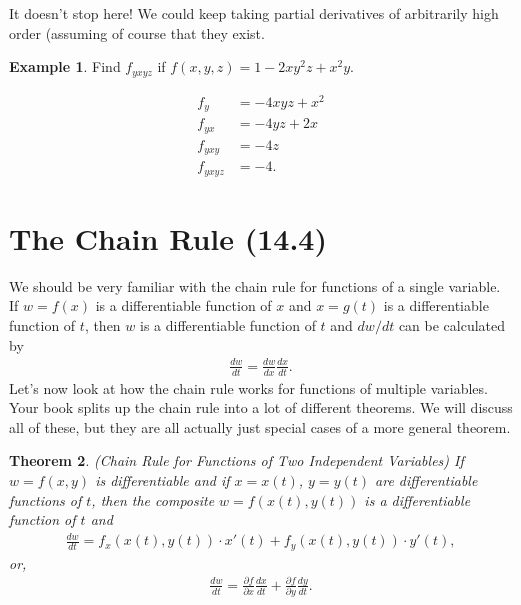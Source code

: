 \documentclass[12pt, letter]{article}
\theoremstyle{plain}
\newtheorem{theorem}{Theorem}
\numberwithin{theorem}{section}
\theoremstyle{definition}
\newtheorem{example}[theorem]{Example}
\begin{document}
\bigskip

\hrulefill

\bigskip

It doesn't stop here! We could keep taking partial derivatives of arbitrarily high order (assuming of course that they exist.

\bigskip

\hrulefill

\bigskip

\begin{example}
Find $f_{yxyz}$ if $f(x,y,z) = 1-2xy^2z+x^2y$.

\smallskip

\begin{align*}
f_y &= -4xyz+x^2\\
f_{yx} &= -4yz+2x\\
f_{yxy} &= -4z\\
f_{yxyz} &= -4.
\end{align*}
\end{example}

\newpage


\section{The Chain Rule (14.4)}

We should be very familiar with the chain rule for functions of a single variable. If $w=f(x)$ is a differentiable function of $x$ and $x=g(t)$ is a differentiable function of $t$, then $w$ is a differentiable function of $t$ and $dw / dt$ can be calculated by
\begin{align*}
\frac{dw}{dt} = \frac{dw}{dx} \frac{dx}{dt}.
\end{align*}
Let's now look at how the chain rule works for functions of multiple variables. Your book splits up the chain rule into a lot of different theorems. We will discuss all of these, but they are all actually just special cases of a more general theorem.

\bigskip

\hrulefill

\bigskip

\begin{theorem}{(Chain Rule for Functions of Two Independent Variables)}
If $w=f(x,y)$ is differentiable and if $x=x(t)$, $y=y(t)$ are differentiable functions of $t$, then the composite $w=f(x(t),y(t))$ is a differentiable function of $t$ and
\begin{align*}
\frac{dw}{dt} = f_x(x(t),y(t)) \cdot x'(t) + f_y(x(t),y(t))\cdot y'(t),
\end{align*}
or,
\begin{align*}
\frac{dw}{dt} = \frac{\partial f}{\partial x} \frac{dx}{dt} + \frac{\partial f}{\partial y} \frac{dy}{dt}.
\end{align*}
\end{theorem}
\end{document}
